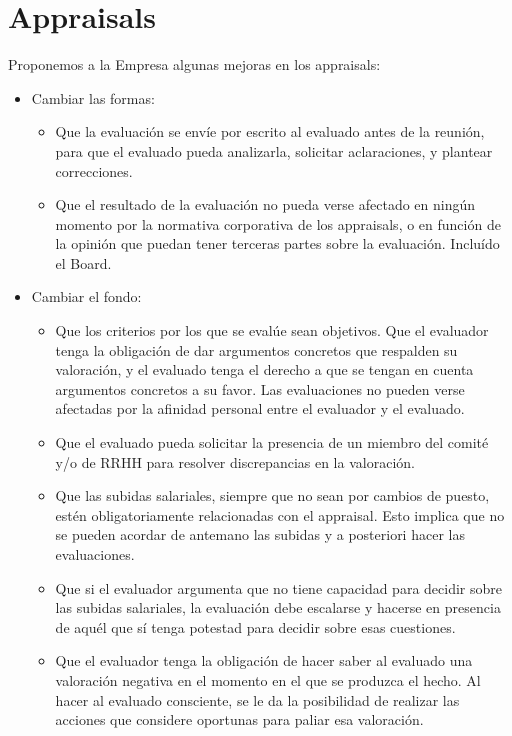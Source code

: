 \documentclass[11pt]{article}
\begin{document}
\section{Appraisals}
\label{sec-3}
Proponemos a la Empresa algunas mejoras en los appraisals:
\begin{itemize}
\item Cambiar las formas:
\begin{itemize}
\item Que la evaluación se envíe por escrito al evaluado antes de la reunión, para que el evaluado pueda analizarla, solicitar aclaraciones, y plantear correcciones.
\item Que el resultado de la evaluación no pueda verse afectado en ningún momento por la normativa corporativa de los appraisals, o en función de la opinión que puedan tener terceras partes sobre la evaluación. Incluído el Board.
\end{itemize}
\item Cambiar el fondo:
\begin{itemize}
\item Que los criterios por los que se evalúe sean objetivos. Que el evaluador tenga la obligación de dar argumentos concretos que respalden su valoración, y el evaluado tenga el derecho a que se tengan en cuenta argumentos concretos a su favor. Las evaluaciones no pueden verse afectadas por la afinidad personal entre el evaluador y el evaluado.
\item Que el evaluado pueda solicitar la presencia de un miembro del comité y/o de RRHH para resolver discrepancias en la valoración.
\item Que las subidas salariales, siempre que no sean por cambios de puesto, estén obligatoriamente relacionadas con el appraisal. Esto implica que no se pueden acordar de antemano las subidas y a posteriori hacer las evaluaciones.
\item Que si el evaluador argumenta que no tiene capacidad para decidir sobre las subidas salariales, la evaluación debe escalarse y hacerse en presencia de aquél que sí tenga potestad para decidir sobre esas cuestiones.
\item Que el evaluador tenga la obligación de hacer saber al evaluado una valoración negativa en el momento en el que se produzca el hecho. Al hacer al evaluado consciente, se le da la posibilidad de realizar las acciones que considere oportunas para paliar esa valoración.
\end{itemize}
\end{itemize}
\end{document}

